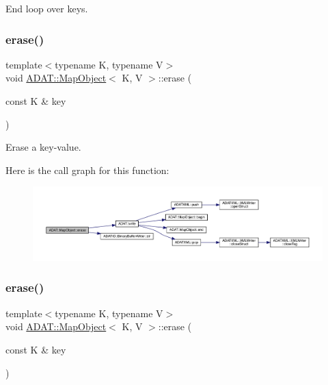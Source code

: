 End loop over keys. 

\mbox{\label{classADAT_1_1MapObject_aa93bbf650a37c70e91904c9e7566eb6f}} 
\subsubsection{\texorpdfstring{erase()}{erase()}\hspace{0.1cm}{\footnotesize\ttfamily [1/3]}}
{\footnotesize\ttfamily template$<$typename K, typename V$>$ \\
void \mbox{\hyperlink{classADAT_1_1MapObject}{A\+D\+A\+T\+::\+Map\+Object}}$<$ K, V $>$\+::erase (\begin{DoxyParamCaption}\item[{const K \&}]{key }\end{DoxyParamCaption})\hspace{0.3cm}{\ttfamily [inline]}}



Erase a key-\/value. 

Here is the call graph for this function\+:
\nopagebreak
\begin{figure}[H]
\begin{center}
\leavevmode
\includegraphics[width=350pt]{da/d29/classADAT_1_1MapObject_aa93bbf650a37c70e91904c9e7566eb6f_cgraph}
\end{center}
\end{figure}
\mbox{\label{classADAT_1_1MapObject_aa93bbf650a37c70e91904c9e7566eb6f}} 
\subsubsection{\texorpdfstring{erase()}{erase()}\hspace{0.1cm}{\footnotesize\ttfamily [2/3]}}
{\footnotesize\ttfamily template$<$typename K, typename V$>$ \\
void \mbox{\hyperlink{classADAT_1_1MapObject}{A\+D\+A\+T\+::\+Map\+Object}}$<$ K, V $>$\+::erase (\begin{DoxyParamCaption}\item[{const K \&}]{key }\end{DoxyParamCaption})\hspace{0.3cm}{\ttfamily [inline]}}



